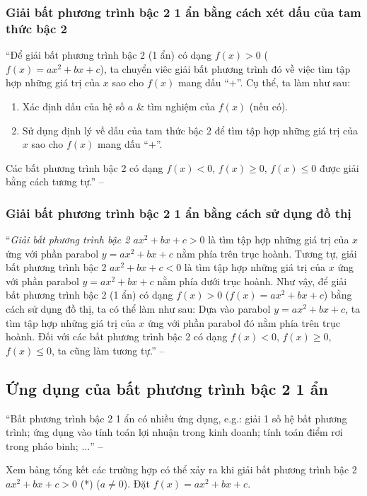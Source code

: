 \documentclass[oneside]{book}
\numberwithin{equation}{section}
\begin{document}
\subsubsection{Giải bất phương trình bậc 2 1 ẩn bằng cách xét dấu của tam thức bậc 2}
``Để giải bất phương trình bậc 2 (1 ẩn) có dạng $f(x) > 0$ ($f(x) = ax^2 + bx + c$), ta chuyển viêc giải bất phương trình đó về việc tìm tập hợp những giá trị của $x$ sao cho $f(x)$ mang dấu ``$+$''. Cụ thể, ta làm như sau:
\begin{enumerate}
	\item Xác định dấu của hệ số $a$ \& tìm nghiệm của $f(x)$ (nếu có).
	\item Sử dụng định lý về dấu của tam thức bậc 2 để tìm tập hợp những giá trị của $x$ sao cho $f(x)$ mang dấu ``$+$''.
\end{enumerate}
Các bất phương trình bậc 2 có dạng $f(x) < 0$, $f(x)\ge 0$, $f(x)\le 0$ được giải bằng cách tương tự.'' -- \cite[p. 50]{SGK_Toan_10_Canh_Dieu_tap_1}

\subsubsection{Giải bất phương trình bậc 2 1 ẩn bằng cách sử dụng đồ thị}
``\textit{Giải bất phương trình bậc 2 $ax^2 + bx + c > 0$} là tìm tập hợp những giá trị của $x$ ứng với phần parabol $y = ax^2 + bx + c$ nằm phía trên trục hoành. Tương tự, giải bất phương trình bậc 2 $ax^2 + bx + c < 0$ là tìm tập hợp những giá trị của $x$ ứng với phần parabol $y = ax^2 + bx + c$ nằm phía dưới trục hoành. Như vậy, để giải bất phương trình bậc 2 (1 ẩn) có dạng $f(x) > 0$ ($f(x) = ax^2 + bx + c$) bằng cách sử dụng đồ thị, ta có thể làm như sau: Dựa vào parabol $y = ax^2 + bx + c$, ta tìm tập hợp những giá trị của $x$ ứng với phần parabol đó nằm phía trên trục hoành. Đối với các bất phương trình bậc 2 có dạng $f(x) < 0$, $f(x)\ge 0$, $f(x)\le 0$, ta cũng làm tương tự.'' -- \cite[p. 51]{SGK_Toan_10_Canh_Dieu_tap_1}

\subsection{Ứng dụng của bất phương trình bậc 2 1 ẩn}
``Bất phương trình bậc 2 1 ẩn có nhiều ứng dụng, e.g.: giải 1 số hệ bất phương trình; ứng dụng vào tính toán lợi nhuận trong kinh doanh; tính toán điểm rơi trong pháo binh; $\ldots$'' -- \cite[p. 52]{SGK_Toan_10_Canh_Dieu_tap_1}

Xem \cite[p. 55]{SGK_Toan_10_Canh_Dieu_tap_1} bảng tổng kết các trường hợp có thể xảy ra khi giải bất phương trình bậc 2 $ax^2 + bx + c > 0$ (*) ($a\ne 0$). Đặt $f(x) = ax^2 + bx + c$.
\end{document}

